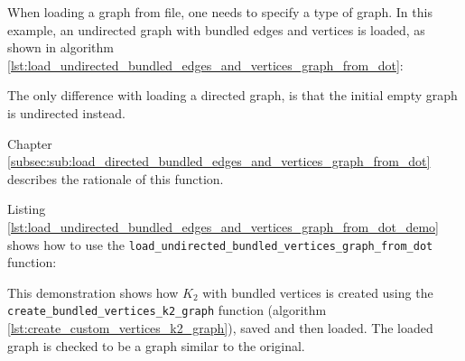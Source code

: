 When loading a graph from file, one needs to specify a type of graph.
In this example, an undirected graph with bundled edges and vertices is
loaded, as shown in algorithm 
\ref{lst:load_undirected_bundled_edges_and_vertices_graph_from_dot}:



The only difference with loading a directed graph, is that the initial empty
graph is undirected instead.

Chapter \ref{subsec:sub:load_directed_bundled_edges_and_vertices_graph_from_dot}
describes the rationale of this function.

Listing \ref{lst:load_undirected_bundled_edges_and_vertices_graph_from_dot_demo}
shows how to use the \verb;load_undirected_bundled_vertices_graph_from_dot;
function:



This demonstration shows how $K_{2}$
with bundled vertices is created using the 
\verb;create_bundled_vertices_k2_graph; function 
(algorithm \ref{lst:create_custom_vertices_k2_graph}), 
saved and then loaded. 
The loaded graph is checked to be a graph similar to the original.

